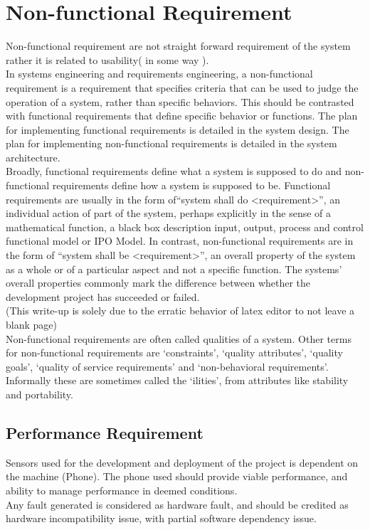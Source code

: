 \section{Non-functional Requirement}
\label{sec:sec06}
Non-functional requirement are not straight forward requirement of the system rather it is related to usability( in some way ).\\
In systems engineering and requirements engineering, a non-functional requirement is a requirement that specifies criteria that can be used to judge the operation of a system, rather than specific behaviors. This should be contrasted with functional requirements that define specific behavior or functions. The plan for implementing functional requirements is detailed in the system design. The plan for implementing non-functional requirements is detailed in the system architecture.\\
Broadly, functional requirements define what a system is supposed to do and non-functional requirements define how a system is supposed to be. Functional requirements are usually in the form of``system shall do <requirement>'', an individual action of part of the system, perhaps explicitly in the sense of a mathematical function, a black box description input, output, process and control functional model or IPO Model. In contrast, non-functional requirements are in the form of ``system shall be <requirement>'', an overall property of the system as a whole or of a particular aspect and not a specific function. The systems' overall properties commonly mark the difference between whether the development project has succeeded or failed.\\
(This write-up is solely due to the erratic behavior of latex editor to not leave a blank page)\\
Non-functional requirements are often called qualities of a system. Other terms for non-functional requirements are `constraints', `quality attributes', `quality goals', `quality of service requirements' and `non-behavioral requirements'. Informally these are sometimes called the `ilities', from attributes like stability and portability.\\


\subsection{Performance Requirement}
\label{subsec:subsec01}
Sensors used for the development and deployment of the project is dependent on the machine (Phone). The phone used should provide viable performance, and ability to manage performance in deemed conditions. \\
Any fault generated is considered as hardware fault, and should be credited as hardware incompatibility issue, with partial software dependency issue.


